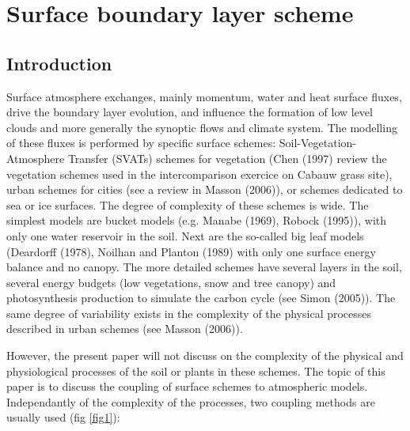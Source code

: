 

\chapter{Surface boundary layer scheme}\label{SBL}
\minitoc



\section{Introduction}

Surface atmosphere exchanges, mainly momentum, water and heat surface fluxes, drive the boundary layer evolution, and influence the formation of low level clouds and more generally the synoptic flows and climate system. The modelling of these fluxes is performed by specific surface schemes: Soil-Vegetation-Atmosphere Transfer (SVATs) schemes for vegetation (Chen \etal (1997)\nocite{Chen1997} review the vegetation schemes used in the intercomparison exercice on Cabauw grass site), urban schemes for cities (see a review in Masson (2006)\nocite{Masson2006}), or schemes dedicated to sea or ice surfaces. The degree of complexity of these schemes is wide. The simplest models are bucket models (e.g. Manabe (1969)\nocite{Manabe1969}, Robock \etal (1995)\nocite{Robock1995}), with only one water reservoir in the soil. Next are the so-called big leaf models (Deardorff (1978), Noilhan and Planton (1989)\nocite{Noilhan1989} with only one surface energy balance and no canopy. The more detailed schemes have several layers in the soil, several energy budgets (low vegetations, snow and tree canopy) and photosynthesis production to simulate the carbon cycle (see Simon \etal (2005)\nocite{Simon2005}). The same degree of variability exists in the complexity of the physical processes described in urban schemes (see Masson (2006)).

However, the present paper will not discuss on the complexity of the physical and physiological processes of the soil or plants in these schemes. The topic of this paper is to discuss the coupling of surface schemes to atmospheric models. Independantly of the complexity of the processes, two coupling methods are usually used (fig \ref{fig1}):


